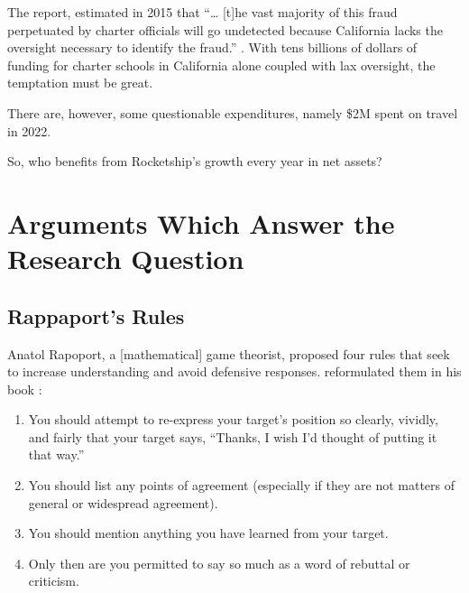 The report,  estimated in 2015 that ``\ldots{} [t]he vast majority of this fraud perpetuated by charter officials will go undetected because California lacks the oversight necessary to identify the fraud.'' . With tens billions of dollars of funding for charter schools in California alone coupled with lax oversight, the temptation must be great. 

There are, however, some questionable expenditures, namely \$2M spent on travel in 2022.

So, who benefits from Rocketship's growth every year in net assets?

\section{Arguments Which Answer the Research Question}%
\label{sec:appr-answ-rese-quest}\indent%

\subsection{Rappaport's Rules}%
\label{sec:rappaports-rules}\indent%

Anatol Rapoport, a [mathematical] game theorist, proposed four rules that seek to increase understanding and avoid defensive responses.  reformulated them in his book  \parencite{Dennett2013}:
\begin{enumerate}[topsep=0.3\baselineskip,itemsep=0.25\baselineskip]
  \item You should attempt to re-express your target’s position so clearly, vividly, and fairly that your target says, “Thanks, I wish I’d thought of putting it that way.”
  \item You should list any points of agreement (especially if they are not matters of general or widespread agreement).
  \item You should mention anything you have learned from your target.
  \item Only then are you permitted to say so much as a word of rebuttal or criticism.
\end{enumerate}
\medskip


